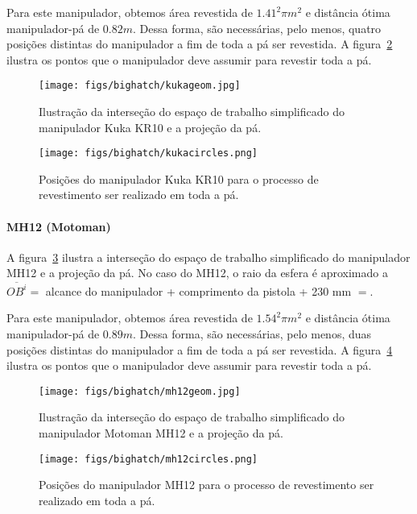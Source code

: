Para este manipulador, obtemos área revestida de $1.41^2\pi m^2$ e distância
ótima manipulador-pá de $0.82 m$. Dessa forma, são necessárias, pelo menos,
quatro posições distintas do manipulador a fim de toda a pá ser revestida. A
figura~\ref{fig::kukacircles} ilustra os pontos que o manipulador deve assumir
para revestir toda a pá. 

\begin{figure}[h!]	
	\texttt{[image: figs/bighatch/kukageom.jpg]}
	\caption{Ilustração da interseção do espaço de trabalho simplificado do
	manipulador Kuka KR10 e a projeção da pá.}
	\label{fig::kukageom}
\end{figure}

\begin{figure}[h!]	
	\texttt{[image: figs/bighatch/kukacircles.png]}
	\caption{Posições do manipulador Kuka KR10 para o processo de
	revestimento ser realizado em toda a pá.}
	\label{fig::kukacircles}
\end{figure}

\paragraph{MH12 (Motoman)}
A figura~\ref{fig::mh12geom} ilustra a interseção do espaço de trabalho
simplificado do manipulador MH12 e a projeção da pá. No
caso do MH12, o raio da esfera é aproximado a $\overline{OB^i} = $
alcance do manipulador + comprimento da pistola + 230 mm $= $. 

Para este manipulador, obtemos área revestida de $1.54^2\pi m^2$ e distância
ótima manipulador-pá de $0.89 m$. Dessa forma, são necessárias, pelo menos,
duas posições distintas do manipulador a fim de toda a pá ser revestida. A
figura~\ref{fig::mh12circles} ilustra os pontos que o manipulador deve assumir
para revestir toda a pá.		

\begin{figure}[h!]	
	\texttt{[image: figs/bighatch/mh12geom.jpg]}
	\caption{Ilustração da interseção do espaço de trabalho simplificado do
	manipulador Motoman MH12 e a projeção da pá.}
	\label{fig::mh12geom}
\end{figure}

\begin{figure}[h!]	
	\texttt{[image: figs/bighatch/mh12circles.png]}
	\caption{Posições do manipulador MH12 para o processo de
	revestimento ser realizado em toda a pá.}
	\label{fig::mh12circles}
\end{figure}